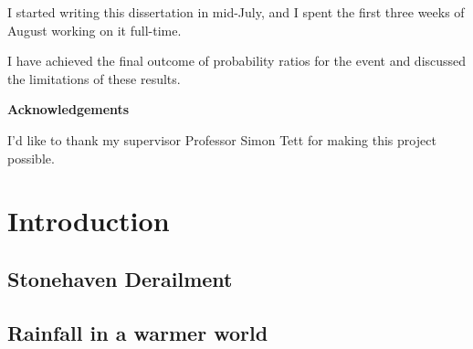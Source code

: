\documentclass[12pt,a4paper]{report}
\begin{document}
I started writing this dissertation in mid-July, and I spent the first
three weeks of August working on it full-time.

I have achieved the final outcome of probability ratios for the event and
    discussed the limitations of these results.


\newpage

\begin{center}
\textbf{Acknowledgements}
\end{center}

I'd like to thank my supervisor Professor Simon Tett for
making this project possible.



\tableofcontents
\listoftables
\listoffigures


\chapter{Introduction}\label{ch:intro}

\section{Stonehaven Derailment}\label{sec:stonederail}


\section{Rainfall in a warmer world}\label{sec:warmerrainfall}

\end{document}
